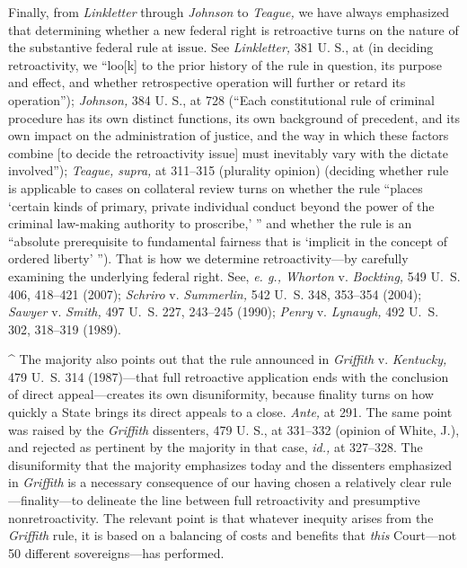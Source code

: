   Finally, from \emph{Linkletter} through \emph{Johnson} to \emph{Teague,} we have always emphasized that determining whether a new federal right is retroactive turns on the nature of the substantive federal rule at issue. See \emph{Linkletter,} 381 U. S., at  (in deciding retroactivity, we ``loo[k] to the prior history of the rule in question, its purpose and effect, and whether retrospective operation will further or retard its operation''); \emph{Johnson,} 384 U. S., at 728 (``Each constitutional rule of criminal procedure has its own distinct functions, its own background of precedent, and its own impact on the administration of justice, and the way in which these factors combine [to decide the retroactivity issue] must inevitably vary with the dictate involved''); \emph{Teague, supra,} at 311--315 (plurality opinion) (deciding whether rule is applicable to cases on collateral review turns on whether the rule ``places ‘certain kinds of primary, private individual conduct beyond the power of the criminal law-making authority to proscribe,' '' and whether the rule is an ``absolute prerequisite to fundamental fairness that is ‘implicit in the concept of ordered liberty' ''). That is how we determine retroactivity---by carefully examining the underlying federal right. See, \emph{e. g., Whorton} v. \emph{Bockting,} 549 U.~S. 406, 418--421 (2007); \emph{Schriro} v. \emph{Summerlin,} 542 U.~S. 348, 353--354 (2004); \emph{Sawyer} v. \emph{Smith,} 497 U.~S. 227, 243--245 (1990); \emph{Penry} v. \emph{Lynaugh,} 492 U.~S. 302, 318--319 (1989).


  ^ The majority also points out that the rule announced in \emph{Griffith} v. \emph{Kentucky,} 479 U.~S. 314 (1987)---that full retroactive application ends with the conclusion of direct appeal---creates its own disuniformity, because finality turns on how quickly a State brings its direct appeals to a close. \emph{Ante,} at 291. The same point was raised by the \emph{Griffith} dissenters, 479 U. S., at 331--332 (opinion of White, J.), and rejected as pertinent by the majority in that case, \emph{id.,} at 327--328. The disuniformity that the majority emphasizes today and the dissenters emphasized in \emph{Griffith} is a necessary consequence of our having chosen a relatively clear rule---finality---to delineate the line between full retroactivity and presumptive nonretroactivity. The relevant point is that whatever inequity arises from the \emph{Griffith} rule, it is based on a balancing of costs and benefits that \emph{this} Court---not 50 different sovereigns---has performed.

